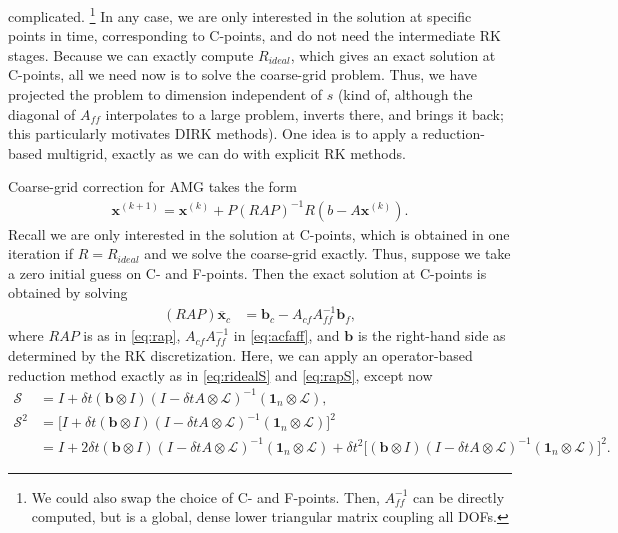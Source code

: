 \documentclass[a4paper,12pt]{article}
\begin{document}
complicated. \footnote{
We could also swap the choice of C- and F-points. Then, $A_{ff}^{-1}$ can be directly computed, but is a global, dense lower triangular
matrix coupling all DOFs.} In any case, we are only interested in the solution at specific points in time, corresponding to C-points, and
do not need the intermediate RK stages. Because we can exactly compute $R_{ideal}$, which gives an exact solution at C-points, all we
need now is to solve the coarse-grid problem. Thus, we have projected the problem to dimension independent of $s$ (kind of, although
the diagonal of $A_{ff}$ interpolates to a large problem, inverts there, and brings it back; this particularly motivates DIRK methods). 
One idea is to apply a reduction-based multigrid, exactly as we can do with explicit RK methods.

Coarse-grid correction for AMG takes the form
%
\begin{align*}
\mathbf{x}^{(k+1)} = \mathbf{x}^{(k)} + P(RAP)^{-1}R(b - A\mathbf{x}^{(k)}).
\end{align*}
%
Recall we are only interested in the solution at C-points, which is obtained in one iteration if $R = R_{ideal}$ and we
solve the coarse-grid exactly. Thus, suppose we take a zero initial guess on C- and F-points. Then the exact solution
at C-points is obtained by solving
%
\begin{align*}
(RAP)\overline{\mathbf{x}}_c & = \mathbf{b}_c - A_{cf}A_{ff}^{-1}\mathbf{b}_f,
\end{align*}
%
where $RAP$ is as in \eqref{eq:rap}, $A_{cf}A_{ff}^{-1}$ in \eqref{eq:acfaff}, and $\mathbf{b}$ is the right-hand side
as determined by the RK discretization. Here, we can apply an operator-based reduction method exactly as in \eqref{eq:ridealS}
and \eqref{eq:rapS}, except now 
%
\begin{align*}
\mathcal{S} & = I + \delta t(\mathbf{b}\otimes I )(I - \delta tA\otimes \mathcal{L})^{-1}(\mathbf{1}_n \otimes \mathcal{L}), \\
\mathcal{S}^2 & = \Big[ I + \delta t(\mathbf{b}\otimes I )(I - \delta tA\otimes \mathcal{L})^{-1}(\mathbf{1}_n \otimes \mathcal{L}) \Big]^2 \\
	 & = I + 2\delta t (\mathbf{b}\otimes I )(I - \delta tA\otimes \mathcal{L})^{-1}(\mathbf{1}_n \otimes \mathcal{L}) + \delta t^2\Big[(\mathbf{b}\otimes I )(I - \delta tA\otimes \mathcal{L})^{-1}(\mathbf{1}_n \otimes \mathcal{L}) \Big]^2.
\end{align*}
%
\end{document}
